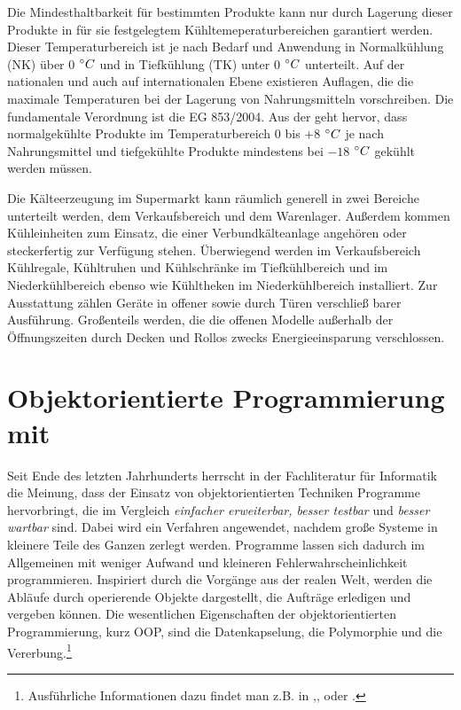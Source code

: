 Die Mindesthaltbarkeit f\"ur bestimmten Produkte kann nur durch Lagerung
dieser Produkte in f\"ur sie festgelegtem K\"uhltemeperaturbereichen
garantiert werden. Dieser Temperaturbereich ist je nach Bedarf und Anwendung in
Normalk\"uhlung (NK) über 0 $^\circ C$ und in
Tiefk\"uhlung (TK) unter 0 $^\circ C$ unterteilt. Auf der
nationalen und auch auf internationalen Ebene existieren Auflagen, die die
maximale Temperaturen bei der Lagerung von Nahrungsmitteln vorschreiben. Die
fundamentale Verordnung ist die EG 853/2004. Aus der geht hervor, dass
normalgekühlte Produkte im Temperaturbereich 0 bis $+8$ $^\circ C$ je nach
Nahrungsmittel und tiefgekühlte Produkte mindestens bei $-18$ $^\circ C$ gekühlt
werden müssen.

Die K\"alteerzeugung im Supermarkt kann r\"aumlich generell in zwei Bereiche
unterteilt werden, dem Verkaufsbereich und dem Warenlager. Au\ss erdem kommen
K\"uhleinheiten zum Einsatz, die einer Verbundk\"alteanlage angeh\"oren oder
steckerfertig zur Verf\"ugung stehen. \"Uberwiegend werden im Verkaufsbereich
K\"uhlregale, K\"uhltruhen und K\"uhlschr\"anke im Tiefk\"uhlbereich und im
Niederk\"uhlbereich ebenso wie K\"uhltheken im Niederk\"uhlbereich installiert.
Zur Ausstattung z\"ahlen Ger\"ate in offener sowie durch T\"uren verschlie\ss
barer Ausf\"uhrung. Gro\ss enteils werden, die die offenen Modelle au\ss erhalb
der \"Offnungszeiten durch Decken und Rollos zwecks Energieeinsparung
verschlossen.


\section{Objektorientierte Programmierung mit \matlab}

Seit Ende des letzten Jahrhunderts herrscht in der Fachliteratur für Informatik
die Meinung, dass der Einsatz von objektorientierten Techniken Programme
hervorbringt, die im Vergleich \textit{einfacher erweiterbar, besser testbar}
und \textit{besser wartbar} sind. Dabei wird ein Verfahren angewendet, nachdem
große Systeme in kleinere Teile des Ganzen zerlegt werden. Programme lassen sich
dadurch im Allgemeinen mit weniger Aufwand und kleineren
Fehlerwahrscheinlichkeit programmieren. Inspiriert durch die Vorgänge aus der
realen Welt, werden die Abläufe durch operierende Objekte dargestellt, die
Aufträge erledigen und vergeben können. Die wesentlichen Eigenschaften der
objektorientierten Programmierung, kurz OOP, sind die Datenkapselung, die Polymorphie und die
Vererbung.\footnote{ Ausführliche Informationen dazu findet
man z.B. in \cite{OOP},\cite{pepperOOP},\cite{java} oder \cite{python}.}


